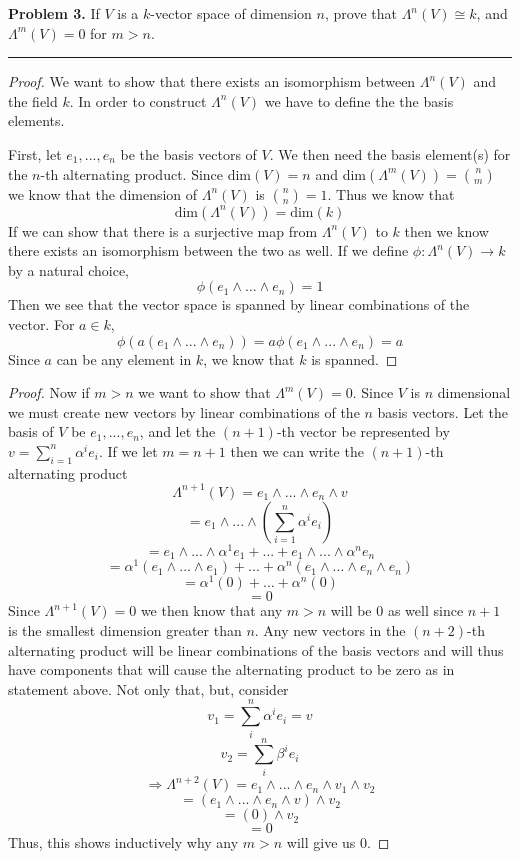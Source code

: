 \documentclass[leqno]{article}
\theoremstyle{nonumberplain}
\newtheorem{proof}{Proof}
\begin{document}
\noindent\textbf{Problem 3.} If $V$ is a $k$-vector space of dimension $n$, prove that $\Lambda^n(V)\cong k$, and $\Lambda^m(V)=0$ for $m>n$.

\noindent\rule[0.5ex]{\linewidth}{1pt}

\begin{proof}
We want to show that there exists an isomorphism between $\Lambda^n(V)$ and the field $k$. In order to construct $\Lambda^n(V)$ we have to define the the basis elements.  

First, let $e_1,...,e_n$ be the basis vectors of $V$.  We then need the basis element(s) for the $n$-th alternating product.  Since dim$(V)=n$ and dim$(\Lambda^m(V))= {n \choose m}$ we know that the dimension of $\Lambda^n(V)$ is ${n \choose n}=1$. Thus we know that 
\[
\textrm{dim}(\Lambda^n(V))=\textrm{dim}(k)
\]
If we can show that there is a surjective map from $\Lambda^n(V)$ to $k$ then we know there exists an isomorphism between the two as well. If we define $\phi: \Lambda^n(V) \rightarrow k$ by a natural choice,
\[
\phi(e_1 \wedge ... \wedge e_n)=1
\]
Then we see that the vector space is spanned by linear combinations of the vector.  For $a \in k$,
\[
\phi(a(e_1 \wedge ... \wedge e_n))=a\phi(e_1 \wedge ... \wedge e_n) = a
\]
Since $a$ can be any element in $k$, we know that $k$ is spanned.
\end{proof}

\begin{proof}
Now if $m>n$ we want to show that $\Lambda^m(V)=0$. Since $V$ is $n$ dimensional we must create new vectors by linear combinations of the $n$ basis vectors.  Let the basis of $V$ be $e_1,...,e_n$, and let the $(n+1)$-th vector be represented by $v=\sum_{i=1}^{n}\alpha^i e_i$. If we let $m = n+1$ then we can write the $(n+1)$-th alternating product
\[
\Lambda^{n+1}(V)=e_1 \wedge ... \wedge e_n \wedge v 
\]
\[
=e_1 \wedge ... \wedge \left(\sum_{i=1}^{n}\alpha^i e_i\right)
\]
\[
=e_1 \wedge ... \wedge \alpha^1 e_1 + ... + e_1 \wedge ... \wedge \alpha^n e_n
\]
\[
=\alpha^1(e_1 \wedge ... \wedge e_1) + ... + \alpha^n(e_1 \wedge ... \wedge e_n \wedge e_n)
\]
\[
=\alpha^1(0)+...+\alpha^n(0)
\]
\[=0
\]
Since $\Lambda^{n+1}(V)=0$ we then know that any $m>n$ will be $0$ as well since $n+1$ is the smallest dimension greater than $n$.  Any new vectors in the $(n+2)$-th alternating product will be linear combinations of the basis vectors and will thus have components that will cause the alternating product to be zero as in statement above.  Not only that, but, consider
\[v_1=\sum_i^n \alpha^i e_i=v
\]
\[
v_2=\sum_i^n \beta^i e_i
\]
\[
\Rightarrow \Lambda^{n+2}(V)= e_1 \wedge ... \wedge e_n \wedge v_1 \wedge v_2
\]
\[
=(e_1 \wedge ... \wedge e_n \wedge v) \wedge v_2
\]
\[
=(0)\wedge v_2
\]
\[
=0
\]
Thus, this shows inductively why any $m>n$ will give us $0$.
\end{proof}
\pagebreak
\end{document}
